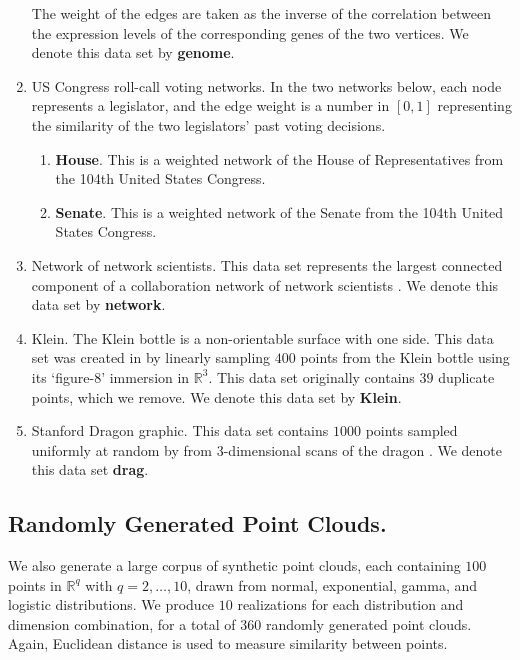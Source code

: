 \begin{enumerate}
    The weight of the edges are taken as the inverse of the correlation between the expression levels of the corresponding genes of the two vertices. We denote this data set by \textbf{genome}.
    \item US Congress roll-call voting networks. In the two networks below, each node represents a legislator, and the edge weight is a number in $[0,1]$ representing the similarity of the two legislators' past voting decisions.
    \begin{enumerate}
        \item \textbf{House}. This is a weighted network of the House of Representatives from the 104th United States Congress. %
        \item \textbf{Senate}. This is a weighted network of the Senate from the 104th United States Congress. %
    \end{enumerate}
    \item Network of network scientists. This data set represents the largest connected component of a collaboration network of network scientists \cite{newman2006finding}. %
    We denote this data set by \textbf{network}. 
    \item Klein. The Klein bottle is a non-orientable surface with one side. This data set was created in \cite{roadmap2017} by linearly sampling $400$ points from the Klein bottle using its  `figure-8' immersion in $\mathbb{R}^3$. This data set originally contains $39$ duplicate points, which we remove. %
    We denote this data set by \textbf{Klein}. 
    \item Stanford Dragon graphic. This data set contains $1000$ points sampled uniformly  at random by \cite{roadmap2017} from $3$-dimensional scans of the dragon \cite{drag}. We denote this data set \textbf{drag}.
\end{enumerate}
\vspace{0.2cm} %
\subsection{Randomly Generated Point Clouds.}\label{sec: randompointclouds}
We also generate a large corpus of synthetic point clouds, each containing $100$ points in $\mathbb{R}^q$ with $q = 2,\ldots,10$, drawn from normal, exponential, gamma, and logistic distributions. We produce $10$ realizations for each distribution and dimension combination, for a total of $360$ randomly generated point clouds. Again, Euclidean distance is used to measure similarity between points.

